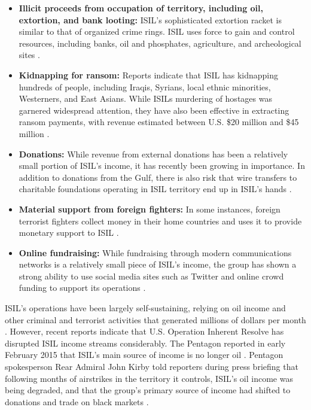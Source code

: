 \documentclass{report}
\begin{document}
\begin{itemize}
\item \textbf{Illicit proceeds from occupation of territory, including oil, extortion, and bank looting:} ISIL's sophisticated extortion racket is similar to that of organized crime rings. ISIL uses force to gain and control resources, including banks, oil and phosphates, agriculture, and archeological sites \cite{Report2015}.
\item \textbf{Kidnapping for ransom:} Reports indicate that ISIL has kidnapping hundreds of people, including Iraqis, Syrians, local ethnic minorities, Westerners, and East Asians. While ISILs murdering of hostages was garnered widespread attention, they have also been effective in extracting ransom payments, with revenue estimated between U.S. \$20 million and \$45 million \cite{Report2015}.
\item \textbf{Donations:} While revenue from external donations has been a relatively small portion of ISIL's income, it has recently been growing in importance. In addition to donations from the Gulf, there is also risk that wire transfers to charitable foundations operating in ISIL territory end up in ISIL's hands \cite{Report2015}. 
\item \textbf{Material support from foreign fighters:} In some instances, foreign terrorist fighters collect money in their home countries and uses it to provide monetary support to ISIL \cite{Report2015}.
\item \textbf{Online fundraising:} While fundraising through modern communications networks is a relatively small  piece of ISIL's income, the group has shown a strong ability to use social media sites such as Twitter and online crowd funding to support its operations \cite{Report2015}.
\end{itemize}


ISIL's operations have been largely self-sustaining, relying on oil income and other criminal and terrorist activities that generated millions of dollars per month \cite{TheWallStreetJournal2014}.  However, recent reports indicate that U.S. Operation Inherent Resolve has disrupted ISIL income streams considerably. The Pentagon reported in early February 2015 that ISIL's main source of income is no longer oil \cite{AlArabiyaNews2015}.  Pentagon spokesperson Rear Admiral John Kirby told reporters during press briefing that following months of airstrikes in the territory it controls, ISIL's oil income was being degraded, and that the group's primary source of income had shifted to donations and trade on black markets \cite{AlArabiyaNews2015}.  
\end{document}
